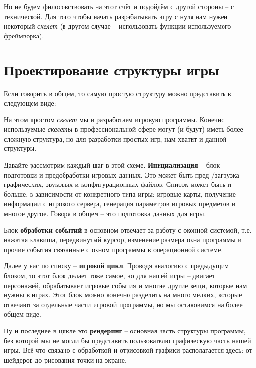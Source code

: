 Но не будем филосовствовать на этот счёт и подойдём с другой стороны -- с технической. Для того чтобы начать
разрабатывать игру с нуля нам нужен некоторый \emph{скелет} (в другом случае -- использовать функции 
используемого фреймворка).

\section{Проектирование структуры игры}

Если говорить в общем, то самую простую структуру можно представить в следующем виде:

\begin{figure}
    \label{img:skeleton}
\end{figure}

На этом простом \emph{скелет} мы и разработаем игровую программы. Конечно используемые \emph{скелеты} в 
профессиональной сфере могут (и будут) иметь более сложную структура, но для разработки простых игр, нам 
хватит и данной структуры.

Давайте рассмотрим каждый шаг в этой схеме. \textbf{Инициализация} -- блок подготовки и предобработки игровых
данных. Это может быть пред-/загрузка графических, звуковых и конфигурационных файлов. Список может быть 
и больше, в зависимости от конкретного типа игры: игровые карты, получение информации с игрового сервера, 
генерация параметров игровых предметов и многое другое. Говоря в общем -- это подготовка данных для игры.

Блок \textbf{обработки событий} в основном отвечает за работу с оконной системой, т.е. нажатая клавиша, 
передвинутый курсор, изменение размера окна программы и прочие события связанные с окном программы в 
операционной системе. 

Далее у нас по списку -- \textbf{игровой цикл}. Проводя аналогию с предыдущим блоком, то этот блок делает 
тоже самое, но для нашей игры -- двигает персонажей, обрабатывает игровые события и многие другие вещи, 
которые нам нужны в играх. Этот блок можно конечно разделить на много мелких, которые отвечают за 
отдельные части игровой программы, но мы остановимся на более общем виде. 

Ну и последнее в цикле это \textbf{рендеринг} -- основная часть структуры программы, без которой мы не могли 
бы представить пользователю графическую часть нашей игры. Всё что связано с обработкой и отрисовкой графики 
располагается здесь: от шейдеров до рисования точки на экране.

